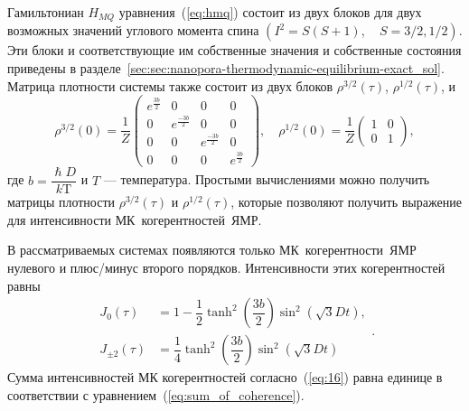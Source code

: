 Гамильтониан $H_{MQ}$ уравнения~(\ref{eq:hmq}) состоит из двух блоков для двух возможных значений углового момента спина $(I^2 = S(S+1), \quad S=3/2,1/2)$.
Эти блоки и соответствующие им собственные значения и собственные состояния приведены
в разделе~\ref{sec:sec:nanopora-thermodynamic-equilibrium-exact_sol}.
Матрица плотности системы также состоит из двух блоков $\rho^{3/2}(\tau)$, $\rho^{1/2}(\tau)$, и
%
\begin{equation}
  \label{eq:15}
  \rho^{3/2}(0) = \dfrac 1 Z
  \begin{pmatrix}
    e^{\frac{3b}{2}} & 0 & 0 & 0
    \\
    0 & e^{\frac{-3b}{2}} & 0 & 0
    \\
    0 & 0 & e^{\frac{-3b}{2}} & 0
    \\
    0 & 0 & 0 & e^{\frac{3b}{2}}
  \end{pmatrix},
  \quad
  \rho^{1/2}(0) = \dfrac 1 Z
  \begin{pmatrix}
    	1 & 0
    \\
    0 & 1
  \end{pmatrix},
\end{equation}
%
где $b = \dfrac{\hslash D}{k\mathrm{T}}$ и $T$ --- температура.
Простыми вычислениями можно получить матрицы плотности $\rho^{3/2}(\tau)$ и $\rho^{1/2}(\tau)$,
которые позволяют получить выражение для интенсивности МК~когерентностей~ЯМР.

В рассматриваемых системах появляются только МК~когерентности~ЯМР нулевого и плюс/минус второго порядков.
Интенсивности этих когерентностей равны
%
\begin{equation}
  \begin{split}
    \label{eq:16}
    J_0(\tau) & = 1
    - \dfrac 1 2 \tanh^2\left( \dfrac{3b}{2} \right)
      \sin^2 \left( \sqrt{3} Dt \right),
    \\
    J_{\pm2}(\tau) & = \dfrac{1}{4}
      \tanh^2 \left( \dfrac{3b}{2} \right)
      \sin^2 \left( \sqrt{3} Dt \right)
  \end{split}.
\end{equation}
%
Сумма интенсивностей МК когерентностей согласно~(\ref{eq:16}) равна единице в соответствии с уравнением~(\ref{eq:sum_of_coherence}).

